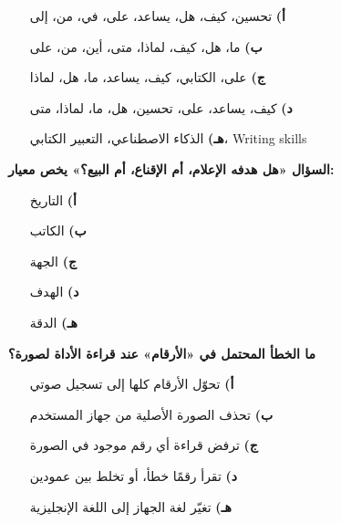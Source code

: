\documentclass[11pt,a4paper]{article}
\begin{document}
\begin{multicols}{2}
\begin{minipage}{\linewidth}
\begin{itemize}[leftmargin=0.95cm, labelsep=4pt, itemsep=0pt, topsep=2pt, parsep=0pt]
  \item[\textbf{أ)}] تحسين، كيف، هل، يساعد، على، في، من، إلى
  \item[\textbf{ب)}] ما، هل، كيف، لماذا، متى، أين، من، على
  \item[\textbf{ج)}] على، الكتابي، كيف، يساعد، ما، هل، لماذا
  \item[\textbf{د)}] كيف، يساعد، على، تحسين، هل، ما، لماذا، متى
  \item[\textbf{هـ)}] الذكاء الاصطناعي، التعبير الكتابي، \textenglish{Writing skills}
\end{itemize}
\end{minipage}\par\vspace{7pt plus 4pt}
\noindent\begin{minipage}{\linewidth}
\hangindent=0.7cm\textbf{السؤال «هل هدفه الإعلام، أم الإقناع، أم البيع؟» يخص معيار:}
\begin{itemize}[leftmargin=0.95cm, labelsep=4pt, itemsep=0pt, topsep=2pt, parsep=0pt]
  \item[\textbf{أ)}] التاريخ
  \item[\textbf{ب)}] الكاتب
  \item[\textbf{ج)}] الجهة
  \item[\textbf{د)}] الهدف
  \item[\textbf{هـ)}] الدقة
\end{itemize}
\end{minipage}\par\vspace{7pt plus 4pt}
\noindent\begin{minipage}{\linewidth}
\hangindent=0.7cm\textbf{ما الخطأ المحتمل في «الأرقام» عند قراءة الأداة لصورة؟}
\begin{itemize}[leftmargin=0.95cm, labelsep=4pt, itemsep=0pt, topsep=2pt, parsep=0pt]
  \item[\textbf{أ)}] تحوّل الأرقام كلها إلى تسجيل صوتي
  \item[\textbf{ب)}] تحذف الصورة الأصلية من جهاز المستخدم
  \item[\textbf{ج)}] ترفض قراءة أي رقم موجود في الصورة
  \item[\textbf{د)}] تقرأ رقمًا خطأ، أو تخلط بين عمودين
  \item[\textbf{هـ)}] تغيّر لغة الجهاز إلى اللغة الإنجليزية
\end{itemize}
\end{minipage}\par\vspace{7pt plus 4pt}

\end{multicols}
\end{document}
